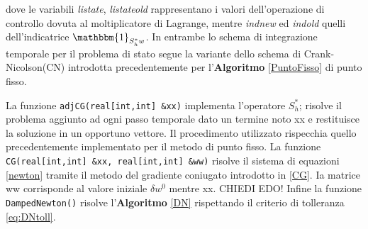 dove le variabili \textit{listate}, \textit{listateold} rappresentano i valori dell'operazione di controllo dovuta al moltiplicatore di Lagrange, mentre \textit{indnew} ed \textit{indold} quelli dell'indicatrice $\mathbbm{1}_{S^*_hw}$.
In entrambe lo schema di integrazione temporale per il problema di stato segue la variante dello schema di Crank-Nicolson(CN) introdotta precedentemente per l'\textbf{Algoritmo} \ref{PuntoFisso} di punto fisso.
\par
La funzione \texttt{adjCG(real[int,int] \&xx)} implementa l'operatore $S^*_h$; risolve il problema aggiunto ad ogni passo temporale dato un termine noto xx e restituisce la soluzione in un opportuno vettore. Il procedimento utilizzato rispecchia quello precedentemente implementato per il metodo di punto fisso.
La funzione \texttt{CG(real[int,int] \&xx, real[int,int] \&ww)} risolve il sistema di equazioni \eqref{newton} tramite il metodo del gradiente coniugato introdotto in \ref{CG}. Ia matrice ww corrisponde al valore iniziale ${\delta}w^0$  mentre xx. CHIEDI EDO!
Infine la funzione \texttt{DampedNewton()} risolve l'\textbf{Algoritmo} \ref{DN} rispettando il criterio di tolleranza \eqref{eq:DNtoll}.